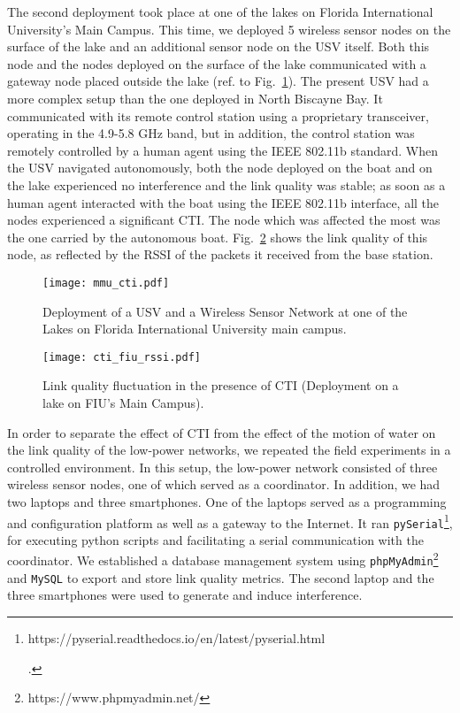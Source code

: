 The second deployment took place at one of the lakes on Florida International University's Main Campus. This time, we deployed 5 wireless sensor nodes on the surface of the lake and an additional sensor node on the USV itself. Both this node and the nodes deployed on the surface of the lake communicated with a gateway node placed outside the lake (ref. to Fig.~\ref{fig:mmu}). The present USV had a more complex setup than the one deployed in North Biscayne Bay. It communicated with its remote control station using a proprietary transceiver, operating in the 4.9-5.8 GHz band, but in addition, the control station was remotely controlled by a human agent using the IEEE 802.11b standard. When the USV navigated autonomously, both the node deployed on the boat and on the lake experienced no interference and the link quality was stable; as soon as a human agent interacted with the boat using the IEEE 802.11b interface, all the nodes experienced a significant CTI. The node which was affected the most was the one carried by the autonomous boat. Fig.~\ref{fig:cti_fiu} shows the link quality of this node, as reflected by the RSSI of the packets it received from  the base station.    

\begin{figure}[t!]
	\centering
	\texttt{[image: mmu\_cti.pdf]}
	\caption{Deployment of a USV and a Wireless Sensor Network at one of the Lakes on Florida International University main campus. }
	\label{fig:mmu}
\end{figure}

\begin{figure}[t!]
	\centering
	\texttt{[image: cti\_fiu\_rssi.pdf]}
	\caption{Link quality fluctuation in the presence of CTI (Deployment on a lake on FIU's Main Campus).}
	\label{fig:cti_fiu}
\end{figure}

In order to separate the effect of CTI from the effect of the motion of water on the link quality of the low-power networks, we repeated the field experiments in a controlled environment. In this setup, the low-power network consisted of three wireless sensor nodes, one of which served as a coordinator. In addition, we had two laptops and three smartphones. One of the laptops served as a programming and configuration platform as well as a gateway to the Internet. It ran \texttt{pySerial}\footnote{\begin{url}https://pyserial.readthedocs.io/en/latest/pyserial.html\end{url}.}, for executing python scripts and facilitating a serial communication with the coordinator. We established a database management system using \texttt{phpMyAdmin}\footnote{https://www.phpmyadmin.net/} and \texttt{MySQL} to export and store link quality metrics. The second laptop and the three smartphones were used to generate and induce interference.

